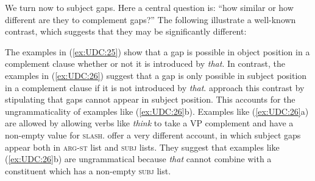 \documentclass[output=paper
,notxmath 
	        ,collection
	        ,collectionchapter
 	        ,biblatex
                ,babelshorthands
                ,newtxmath
                ,draftmode
                ,colorlinks, citecolor=brown
]{langscibook}
\begin{document}


We\label{udc:page-subject-gaps-start} turn now to subject gaps. Here a central question is: ``how similar or
how different are they to complement gaps?'' The following illustrate a
well-known contrast, which suggests that they may be significantly
different:

\begin{exe} \ex \begin{xlist} \label{ex:UDC:25}

\end{xlist}
\end{exe}

\begin{exe} \ex \begin{xlist} \label{ex:UDC:26}

\end{xlist}
\end{exe}

\noindent
The examples in (\ref{ex:UDC:25}) show that a gap is possible in
object position in a complement clause whether or not it is introduced
by \emph{that}. In contrast, the examples in (\ref{ex:UDC:26}) suggest
that a gap is only possible in subject position in a complement clause
if it is not introduced by
\emph{that}. \citet[Chapter~4.4]{Pollard:Sag:94} approach this
contrast by stipulating that gaps cannot appear in subject
position. This accounts for the ungrammaticality of examples like
(\ref{ex:UDC:26}b). Examples like (\ref{ex:UDC:26}a) are allowed by
allowing verbs like \textit{think} to take a VP complement and have a
non-empty value for
\textsc{slash}. \citet[Chapter~5.1.3]{Ginzburg:Sag:01} offer a very
different account, in which subject gaps appear both in
\textsc{arg-st} list and \textsc{subj} lists. They suggest that
examples like (\ref{ex:UDC:26}b) are ungrammatical because \emph{that}
cannot combine with a constituent which has a non-empty \textsc{subj}
list.
\end{document}

